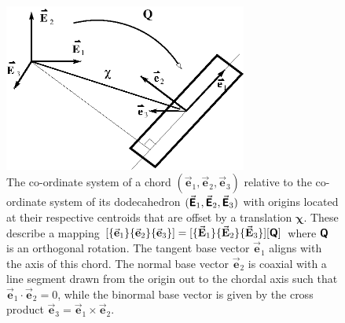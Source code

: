 \begin{figure}
    \centering
    \includegraphics[width=8cm]{figures/chord.png}
    \caption{The co-ordinate system of a chord $( \vec{\mathbf{e}}_1 , \vec{\mathbf{e}}_2 , \vec{\mathbf{e}}_3 )$ relative to the co-ordinate system of its dodecahedron $( \vec{\boldsymbol{\mathsf{E}}}_1 , \vec{\boldsymbol{\mathsf{E}}}_2 , \vec{\boldsymbol{\mathsf{E}}}_3 )$ with origins located at their respective centroids that are offset by a translation $\boldsymbol{\chi}$.  These describe a mapping $[ \{ \vec{\mathbf{e}}_1 \} \{ \vec{\mathbf{e}}_2 \} \{ \vec{\mathbf{e}}_3 \} ] = [ \{ \vec{\mathbf{E}}_1 \} \{ \vec{\mathbf{E}}_2 \} \{ \vec{\mathbf{E}}_3 \} ] [ \boldsymbol{\mathsf{Q}} ]$ where $\boldsymbol{\mathsf{Q}}$ is an orthogonal rotation.  The tangent base vector $\vec{\mathbf{e}}_1$ aligns with the axis of this chord. The normal base vector $\vec{\mathbf{e}}_2$ is coaxial with a line segment drawn from the origin out to the chordal axis such that $\vec{\mathbf{e}}_1 \cdot \vec{\mathbf{e}}_2 = 0$, while the binormal base vector is given by the cross product $\vec{\mathbf{e}}_3 = \vec{\mathbf{e}}_1 \times \vec{\mathbf{e}}_2$.}
    \label{figchord}
\end{figure}

